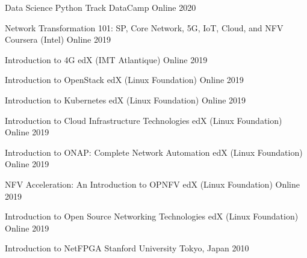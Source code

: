 \begin{cvhonors}
  \cvhonor
    {Data Science Python Track} %
    {DataCamp} %
    {Online} %
    {2020} %

  \cvhonor
    {Network Transformation 101: SP, Core Network, 5G, IoT, Cloud, and NFV} %
    {Coursera (Intel)} %
    {Online} %
    {2019} %

  \cvhonor
    {Introduction to 4G} %
    {edX (IMT Atlantique)} %
    {Online} %
    {2019} %

  \cvhonor
    {Introduction to OpenStack} %
    {edX (Linux Foundation)} %
    {Online} %
    {2019} %

  \cvhonor
    {Introduction to Kubernetes} %
    {edX (Linux Foundation)} %
    {Online} %
    {2019} %

  \cvhonor
    {Introduction to Cloud Infrastructure Technologies} %
    {edX (Linux Foundation)} %
    {Online} %
    {2019} %

  \cvhonor
    {Introduction to ONAP: Complete Network Automation} %
    {edX (Linux Foundation)} %
    {Online} %
    {2019} %

  \cvhonor
    {NFV Acceleration: An Introduction to OPNFV} %
    {edX (Linux Foundation)} %
    {Online} %
    {2019} %

  \cvhonor
    {Introduction to Open Source Networking Technologies} %
    {edX (Linux Foundation)} %
    {Online} %
    {2019} %

  \cvhonor
    {Introduction to NetFPGA} %
    {Stanford University} %
    {Tokyo, Japan} %
    {2010} %

\end{cvhonors}


